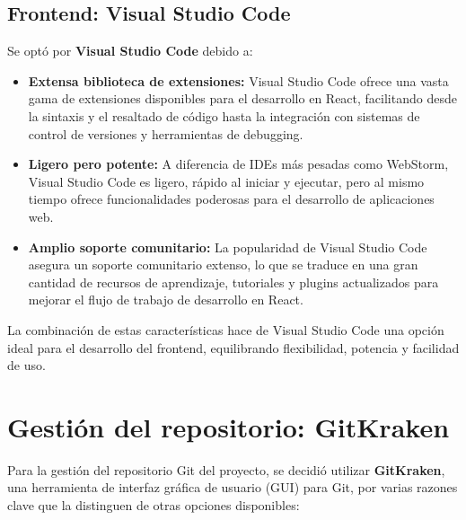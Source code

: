 \subsection{Frontend: Visual Studio Code}
Se optó por \textbf{Visual Studio Code}\cite{VSCode} debido a:
\begin{itemize}
    \item \textbf{Extensa biblioteca de extensiones:} Visual Studio Code ofrece una vasta gama de extensiones disponibles para el desarrollo en React, facilitando desde la sintaxis y el resaltado de código hasta la integración con sistemas de control de versiones y herramientas de debugging.
    \item \textbf{Ligero pero potente:} A diferencia de IDEs más pesadas como WebStorm, Visual Studio Code es ligero, rápido al iniciar y ejecutar, pero al mismo tiempo ofrece funcionalidades poderosas para el desarrollo de aplicaciones web.
    \item \textbf{Amplio soporte comunitario:} La popularidad de Visual Studio Code asegura un soporte comunitario extenso, lo que se traduce en una gran cantidad de recursos de aprendizaje, tutoriales y plugins actualizados para mejorar el flujo de trabajo de desarrollo en React.
\end{itemize}
La combinación de estas características hace de Visual Studio Code una opción ideal para el desarrollo del frontend, equilibrando flexibilidad, potencia y facilidad de uso.

\section{Gestión del repositorio: GitKraken}
Para la gestión del repositorio Git del proyecto, se decidió utilizar \textbf{GitKraken}\cite{GitKraken}, una herramienta de interfaz gráfica de usuario (GUI) para Git, por varias razones clave que la distinguen de otras opciones disponibles:


